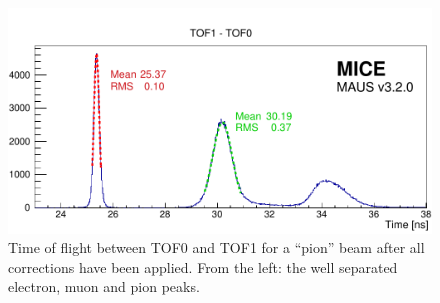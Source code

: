 


\begin{figure}[!htb]
  \begin{center}
    \includegraphics[width=0.6\columnwidth]{TOF_peaks.pdf}
    \caption{Time of flight between TOF0 and TOF1 for a ``pion'' beam
      after all corrections have been applied. From the left: the well
      separated electron, muon and pion peaks.}
    \label{fig:TOF_peaks}
  \end{center}
\end{figure}

